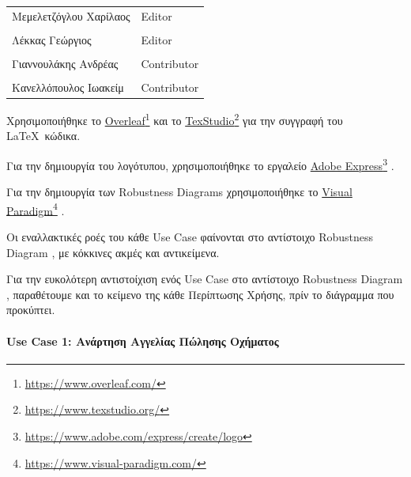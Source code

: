 \documentclass{../ol-softwaremanual}
\newcommand{\doclink}[2]{\href{#1}{#2}\footnote{\url{#1}}}
\begin{document}
	
	\vspace{20pt}
	
	\begin{table}[htbp!]
		\begin{tabular}{ll}
			Μεμελετζόγλου Χαρίλαος & \en Editor \\
			\\ Λέκκας Γεώργιος      &   \en  Editor \\
			\\ Γιαννουλάκης Ανδρέας & \en Contributor \\
			\\ Κανελλόπουλος Ιωακείμ & \en Contributor \\ 
		\end{tabular}
	\end{table}
	
	
	\vspace{20pt}
	
	
	\vspace{20pt}
	\flushleft
	Χρησιμοποιήθηκε το \en \doclink{https://www.overleaf.com/}{Overleaf} \gr και το \en \doclink{https://www.texstudio.org/}{TexStudio} \gr για την συγγραφή του \LaTeX\ κώδικα. \break
	
	Για την δημιουργία του λογότυπου, χρησιμοποιήθηκε το εργαλείο \en \doclink{https://www.adobe.com/express/create/logo}{Adobe Express} . \gr \break
	
	Για την δημιουργία των \en Robustness Diagrams \gr χρησιμοποιήθηκε το \en \doclink{https://www.visual-paradigm.com/}{Visual Paradigm} . \gr \break 
	
	\newpage
	
	\flushleft
	
	Οι εναλλακτικές ροές του κάθε \en Use Case \gr φαίνονται στο αντίστοιχο \en Robustness Diagram \gr, με κόκκινες ακμές και αντικείμενα. \break
	
	Για την ευκολότερη αντιστοίχιση ενός \en Use Case \gr στο αντίστοιχο \en Robustness Diagram \gr, παραθέτουμε και το κείμενο της κάθε Περίπτωσης Χρήσης, πρίν το διάγραμμα που προκύπτει. \\
	
	\newpage
	
	\paragraph{\en Use Case 1: \gr Ανάρτηση Αγγελίας Πώλησης Οχήματος}
	\centering
	
\end{document}
